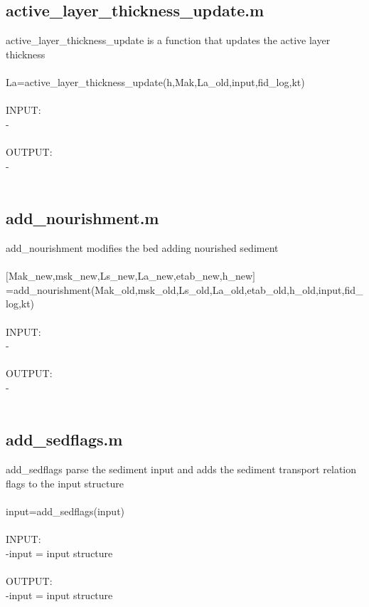 \subsection{active\_layer\_thickness\_update.m}
active\_layer\_thickness\_update is a function that updates the active layer thickness \\ 
 \\ 
La=active\_layer\_thickness\_update(h,Mak,La\_old,input,fid\_log,kt) \\ 
 \\ 
INPUT: \\ 
   - \\ 
 \\ 
OUTPUT: \\ 
   - \\ 
 \\ 
\subsection{add\_nourishment.m}
add\_nourishment modifies the bed adding nourished sediment \\ 
 \\ 
$[$Mak\_new,msk\_new,Ls\_new,La\_new,etab\_new,h\_new$]$=add\_nourishment(Mak\_old,msk\_old,Ls\_old,La\_old,etab\_old,h\_old,input,fid\_log,kt) \\ 
 \\ 
INPUT: \\ 
   - \\ 
 \\ 
OUTPUT: \\ 
   - \\ 
 \\ 
\subsection{add\_sedflags.m}
add\_sedflags parse the sediment input and adds the sediment transport relation flags to the input structure  \\ 
 \\ 
input=add\_sedflags(input) \\ 
 \\ 
INPUT: \\ 
   -input = input structure \\ 
 \\ 
OUTPUT: \\ 
   -input = input structure \\ 
 \\ 
